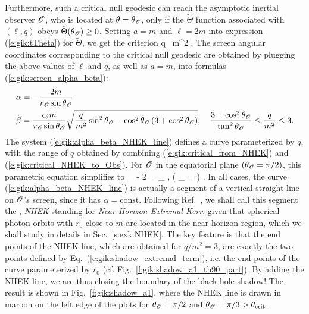 Furthermore, such a critical null geodesic can reach the asymptotic inertial
observer $\mathscr{O}$, who is located at $\theta = \theta_{\mathscr{O}}$, only if the
$\tilde{\Theta}$ function associated with $(\ell,q)$ obeys $\tilde{\Theta}(\theta_{\mathscr{O}}) \geq 0$.
Setting $a=m$ and $\ell=2m$ into expression (\ref{e:gik:tTheta}) for $\tilde{\Theta}$,
we get the criterion
\be \label{e:gik:critical_NHEK_to_Obs}
    q \geq {} \, m^2 .
\ee
The screen angular coordinates corresponding to the critical null geodesic
are obtained by plugging the
above values of $\ell$ and $q$, as well as $a=m$, into formulas (\ref{e:gik:screen_alpha_beta}):
\begin{subequations}
\label{e:gik:alpha_beta_NHEK_line}
\begin{align}
& \alpha = - \frac{2 m}{r_{\mathscr{O}}\sin\theta_{\mathscr{O}}}  \\
&  \beta = \frac{\epsilon_\theta m}{r_{\mathscr{O}}\sin\theta_{\mathscr{O}}} \sqrt{ \frac{q}{m^2}\sin^2\theta_{\mathscr{O}}
 - \cos^2\theta_{\mathscr{O}} \left( 3 + \cos^2\theta_{\mathscr{O}} \right)  },
 \quad \frac{3 + \cos^2\theta_{\mathscr{O}}}{\tan^2\theta_{\mathscr{O}}}  \leq \frac{q}{m^2} \leq 3 .
\end{align}
\end{subequations}
The system (\ref{e:gik:alpha_beta_NHEK_line}) defines a curve parameterized by $q$,
with the range of $q$ obtained by combining (\ref{e:gik:critical_from_NHEK}) and (\ref{e:gik:critical_NHEK_to_Obs}).
For $\mathscr{O}$ in the equatorial plane $(\theta_{\mathscr{O}} = \pi/2)$, this parametric equation
simplifies to
\be
    \alpha = - 2 
    \qand
    \beta = \eps_\th {} ,
     \leq {}   \qquad\left( \th_{\Obs} =  \right) .
\ee
In all cases, the curve (\ref{e:gik:alpha_beta_NHEK_line})
is actually a segment of a vertical straight line on $\mathscr{O}$'s screen, since it
has $\alpha=\mathrm{const}$. Following Ref.~\cite{GrallLS18},
we shall call this segment the , \emph{NHEK} standing
for \emph{Near-Horizon Extremal Kerr}, given that spherical photon orbits
with $r_0$ close to $m$ are located in the near-horizon region, which we shall
study in details in Sec.~\ref{s:exk:NHEK}.
The key feature is that the end points
of the NHEK line, which are obtained for $q/m^2 = 3$,
are exactly the two points defined by Eq.~(\ref{e:gik:shadow_extremal_term}),
i.e. the end points of the curve parameterized by $r_0$ (cf. Fig.~\ref{f:gik:shadow_a1_th90_part}).
By adding the NHEK line, we are thus
closing the boundary of the black hole shadow! The result is shown in Fig.~\ref{f:gik:shadow_a1},
where the NHEK line is drawn in maroon on the left edge of the plots
for $\theta_{\mathscr{O}} = \pi/2$ and $\theta_{\mathscr{O}} = \pi/3 > \theta_{\rm crit}$.

